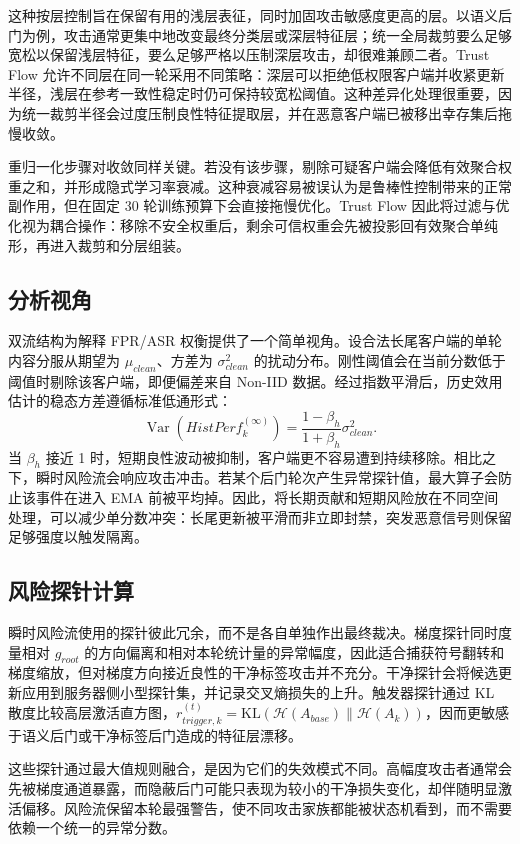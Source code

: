 \documentclass[10pt,a4paper,UTF8,fontset=fandol]{ctexart}
\begin{document}
这种按层控制旨在保留有用的浅层表征，同时加固攻击敏感度更高的层。以语义后门为例，攻击通常更集中地改变最终分类层或深层特征层；统一全局裁剪要么足够宽松以保留浅层特征，要么足够严格以压制深层攻击，却很难兼顾二者。Trust Flow 允许不同层在同一轮采用不同策略：深层可以拒绝低权限客户端并收紧更新半径，浅层在参考一致性稳定时仍可保持较宽松阈值。这种差异化处理很重要，因为统一裁剪半径会过度压制良性特征提取层，并在恶意客户端已被移出幸存集后拖慢收敛。

重归一化步骤对收敛同样关键。若没有该步骤，剔除可疑客户端会降低有效聚合权重之和，并形成隐式学习率衰减。这种衰减容易被误认为是鲁棒性控制带来的正常副作用，但在固定 30 轮训练预算下会直接拖慢优化。Trust Flow 因此将过滤与优化视为耦合操作：移除不安全权重后，剩余可信权重会先被投影回有效聚合单纯形，再进入裁剪和分层组装。

\subsection{分析视角}

双流结构为解释 FPR/ASR 权衡提供了一个简单视角。设合法长尾客户端的单轮内容分服从期望为 $\mu_{clean}$、方差为 $\sigma_{clean}^2$ 的扰动分布。刚性阈值会在当前分数低于阈值时剔除该客户端，即便偏差来自 Non-IID 数据。经过指数平滑后，历史效用估计的稳态方差遵循标准低通形式：
\begin{equation}
    \operatorname{Var}(HistPerf_k^{(\infty)})=\frac{1-\beta_h}{1+\beta_h}\sigma_{clean}^2 .
\end{equation}
当 $\beta_h$ 接近 1 时，短期良性波动被抑制，客户端更不容易遭到持续移除。相比之下，瞬时风险流会响应攻击冲击。若某个后门轮次产生异常探针值，最大算子会防止该事件在进入 EMA 前被平均掉。因此，将长期贡献和短期风险放在不同空间处理，可以减少单分数冲突：长尾更新被平滑而非立即封禁，突发恶意信号则保留足够强度以触发隔离。

\subsection{风险探针计算}

瞬时风险流使用的探针彼此冗余，而不是各自单独作出最终裁决。梯度探针同时度量相对 $g_{root}$ 的方向偏离和相对本轮统计量的异常幅度，因此适合捕获符号翻转和梯度缩放，但对梯度方向接近良性的干净标签攻击并不充分。干净探针会将候选更新应用到服务器侧小型探针集，并记录交叉熵损失的上升。触发器探针通过 KL 散度比较高层激活直方图，$r_{trigger,k}^{(t)}=\mathrm{KL}(\mathcal{H}(A_{base})\|\mathcal{H}(A_k))$，因而更敏感于语义后门或干净标签后门造成的特征层漂移。

这些探针通过最大值规则融合，是因为它们的失效模式不同。高幅度攻击者通常会先被梯度通道暴露，而隐蔽后门可能只表现为较小的干净损失变化，却伴随明显激活偏移。风险流保留本轮最强警告，使不同攻击家族都能被状态机看到，而不需要依赖一个统一的异常分数。
\end{document}
